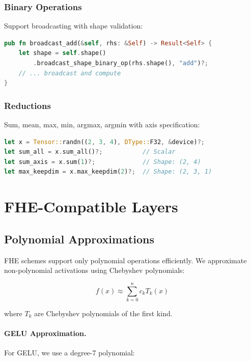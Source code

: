 \documentclass[11pt,twocolumn]{article}
\begin{document}
\subsubsection{Binary Operations}

Support broadcasting with shape validation:

\begin{lstlisting}[language=Rust]
pub fn broadcast_add(&self, rhs: &Self) -> Result<Self> {
    let shape = self.shape()
        .broadcast_shape_binary_op(rhs.shape(), "add")?;
    // ... broadcast and compute
}
\end{lstlisting}

\subsubsection{Reductions}

Sum, mean, max, min, argmax, argmin with axis specification:

\begin{lstlisting}[language=Rust]
let x = Tensor::randn((2, 3, 4), DType::F32, &device)?;
let sum_all = x.sum_all()?;           // Scalar
let sum_axis = x.sum(1)?;             // Shape: (2, 4)
let max_keepdim = x.max_keepdim(2)?;  // Shape: (2, 3, 1)
\end{lstlisting}

\section{FHE-Compatible Layers}

\subsection{Polynomial Approximations}

FHE schemes support only polynomial operations efficiently. We approximate non-polynomial activations using Chebyshev polynomials:

\begin{equation}
    f(x) \approx \sum_{k=0}^{n} c_k T_k(x)
\end{equation}

where $T_k$ are Chebyshev polynomials of the first kind.

\paragraph{GELU Approximation.} For GELU, we use a degree-7 polynomial:
\end{document}
